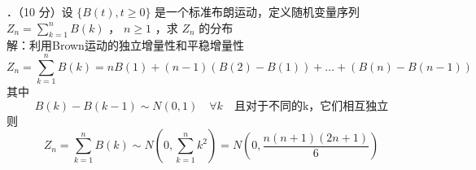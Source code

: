 \documentclass[UTF8]{ctexart}
\begin{document}
．（10 分）设 $\{B(t), t \geq 0\}$ 是一个标准布朗运动，定义随机变量序列 $Z_{n} = \sum_{k=1}^{n} B(k)$ ， $n \geq 1$ ，求 $Z_{n}$ 的分布\\
解：利用Brown运动的独立增量性和平稳增量性\\
\[
Z_{n} = \sum_{k=1}^{n} B(k)=nB(1)+(n-1)(B(2)-B(1))+\dots+(B(n)-B(n-1))
\]
其中
\[
B(k)-B(k-1) \sim N(0,1) \quad \forall k \quad \text{且对于不同的k，它们相互独立}
\]
则
\[
Z_{n} = \sum_{k=1}^{n} B(k) \sim N\left(0,\sum_{k=1}^{n} k^2\right) = N\left(0,\frac{n(n+1)(2n+1)}{6}\right)
\]
\end{document}
